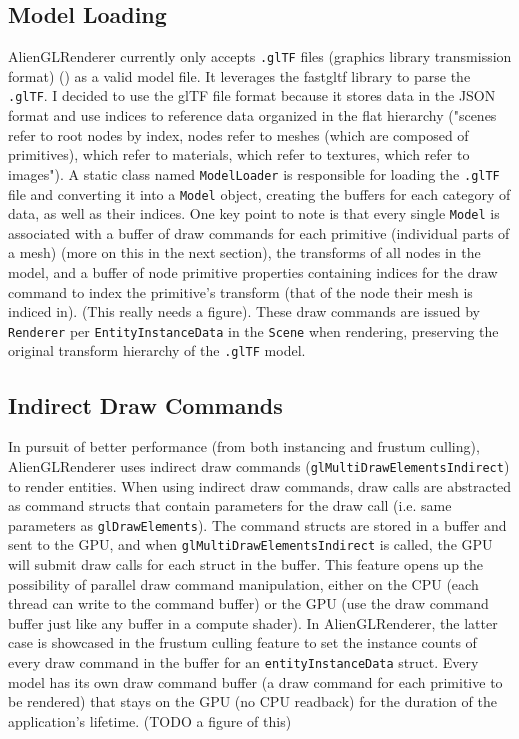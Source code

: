 \documentclass[letterpaper, 10 pt, conference]{ieeeconf}  %
\begin{document}
\subsection {Model Loading}
AlienGLRenderer currently only accepts \texttt{.glTF} files (graphics library transmission format) (\cite{GLTF}) as a valid model file. It leverages the fastgltf library to parse the \texttt{.glTF}. I decided to use the glTF file format because it stores data in the JSON format and use indices to reference data organized in the flat hierarchy ("scenes refer to root nodes by index, nodes refer to meshes (which are composed of primitives), which refer to materials, which refer to textures, which refer to images"). A static class named \texttt{ModelLoader} is responsible for loading the \texttt{.glTF} file and converting it into a \texttt{Model} object, creating the buffers for each category of data, as well as their indices. One key point to note is that every single \texttt{Model} is associated with a buffer of draw commands for each primitive (individual parts of a mesh) (more on this in the next section), the transforms of all nodes in the model, and a buffer of node primitive properties containing indices for the draw command to index the primitive's transform (that of the node their mesh is indiced in). (This really needs a figure). These draw commands are issued by \texttt{Renderer} per \texttt{EntityInstanceData} in the \texttt{Scene} when rendering, preserving the original transform hierarchy of the \texttt{.glTF} model.

\subsection {Indirect Draw Commands}
In pursuit of better performance (from both instancing and frustum culling), AlienGLRenderer uses indirect draw commands (\texttt{glMultiDrawElementsIndirect}) to render entities. When using indirect draw commands, draw calls are abstracted as command structs that contain parameters for the draw call (i.e. same parameters as \texttt{glDrawElements}). The command structs are stored in a buffer and sent to the GPU, and when \texttt{glMultiDrawElementsIndirect} is called, the GPU will submit draw calls for each struct in the buffer. This feature opens up the possibility of parallel draw command manipulation, either on the CPU (each thread can write to the command buffer) or the GPU (use the draw command buffer just like any buffer in a compute shader). In AlienGLRenderer, the latter case is showcased in the frustum culling feature to set the instance counts of every draw command in the buffer for an \texttt{entityInstanceData} struct. Every model has its own draw command buffer (a draw command for each primitive to be rendered) that stays on the GPU (no CPU readback) for the duration of the application's lifetime. (TODO a figure of this)
\end{document}
